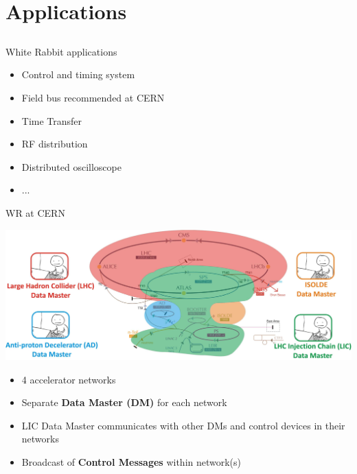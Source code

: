 \documentclass[compress,red]{beamer}
\begin{document}
\section{Applications}
\subsection{}
\begin{frame}{White Rabbit applications}

  \begin{itemize}
    \item Control and timing system
    \item Field bus recommended at CERN
    \item Time Transfer
    \item RF distribution
    \item Distributed oscilloscope
    \item ...
  \end{itemize}

\end{frame}
\begin{frame}{WR at CERN}

      \begin{center}
      \includegraphics[width=.7\textwidth]{applications/CERN/accNetworks.pdf}
      \end{center}

  \begin{itemize}
    \item 4 accelerator networks
    \item Separate {\bf Data Master (DM)} for each network
    \item \textcolor{green!90}{LIC Data Master} communicates with other DMs and control devices in their networks
    \item Broadcast of {\bf Control Messages} within network(s)
  \end{itemize}

\end{frame}
\end{document}
